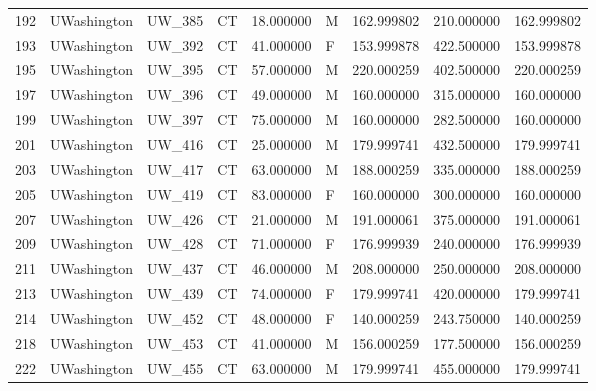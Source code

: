 \begin{tabular}{llllrlrrr}
192    &     UWashington &       UW\_385 &                 CT &  18.000000 &        M &       162.999802 &    210.000000 &  162.999802 \\
193    &     UWashington &       UW\_392 &                 CT &  41.000000 &        F &       153.999878 &    422.500000 &  153.999878 \\
195    &     UWashington &       UW\_395 &                 CT &  57.000000 &        M &       220.000259 &    402.500000 &  220.000259 \\
197    &     UWashington &       UW\_396 &                 CT &  49.000000 &        M &       160.000000 &    315.000000 &  160.000000 \\
199    &     UWashington &       UW\_397 &                 CT &  75.000000 &        M &       160.000000 &    282.500000 &  160.000000 \\
201    &     UWashington &       UW\_416 &                 CT &  25.000000 &        M &       179.999741 &    432.500000 &  179.999741 \\
203    &     UWashington &       UW\_417 &                 CT &  63.000000 &        M &       188.000259 &    335.000000 &  188.000259 \\
205    &     UWashington &       UW\_419 &                 CT &  83.000000 &        F &       160.000000 &    300.000000 &  160.000000 \\
207    &     UWashington &       UW\_426 &                 CT &  21.000000 &        M &       191.000061 &    375.000000 &  191.000061 \\
209    &     UWashington &       UW\_428 &                 CT &  71.000000 &        F &       176.999939 &    240.000000 &  176.999939 \\
211    &     UWashington &       UW\_437 &                 CT &  46.000000 &        M &       208.000000 &    250.000000 &  208.000000 \\
213    &     UWashington &       UW\_439 &                 CT &  74.000000 &        F &       179.999741 &    420.000000 &  179.999741 \\
214    &     UWashington &       UW\_452 &                 CT &  48.000000 &        F &       140.000259 &    243.750000 &  140.000259 \\
218    &     UWashington &       UW\_453 &                 CT &  41.000000 &        M &       156.000259 &    177.500000 &  156.000259 \\
222    &     UWashington &       UW\_455 &                 CT &  63.000000 &        M &       179.999741 &    455.000000 &  179.999741 \\

\end{tabular}
